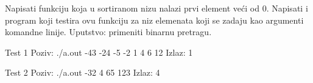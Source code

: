 \begin{Exercise}[label=407]
  Napisati funkciju koja u sortiranom nizu nalazi prvi element veći od
  0. Napisati i program koji
  testira ovu funkciju za niz elemenata koji se zadaju kao argumenti
  komandne linije. Uputstvo: primeniti binarnu pretragu.
  
\begin{miditest}
\begin{test}{Test 1}
Poziv:  ./a.out -43 -24 -5 -2 1 4 6 12
Izlaz:  1
\end{test}
\end{miditest}

\begin{miditest}
\begin{test}{Test 2}
Poziv:  ./a.out -32 4 65 123
Izlaz:  4
\end{test}
\end{miditest}
  
\end{Exercise}

